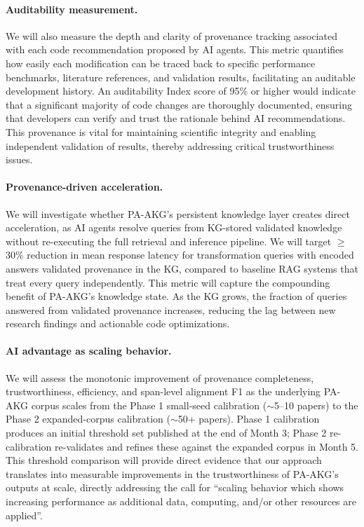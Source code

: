\paragraph{Auditability measurement.} We will also measure the depth and clarity of provenance tracking associated with each code recommendation proposed by AI agents. This metric quantifies how easily each modification can be traced back to specific performance benchmarks, literature references, and validation results, facilitating an auditable development history. An auditability Index score of 95\% or higher would indicate that a significant majority of code changes are thoroughly documented, ensuring that developers can verify and trust the rationale behind AI recommendations. This provenance is vital for maintaining scientific integrity and enabling independent validation of results, thereby addressing critical trustworthiness issues.

\paragraph{Provenance-driven acceleration.} We will investigate whether PA-AKG's persistent knowledge layer creates direct acceleration, as AI agents resolve queries from KG-stored validated knowledge without re-executing the full retrieval and inference pipeline. We will target $\geq$30\% reduction in mean response latency for transformation queries with encoded answers validated provenance in the KG, compared to baseline RAG systems that treat every query independently. This metric will capture the compounding benefit of PA-AKG's knowledge state. As the KG grows, the fraction of queries answered from validated provenance increases, reducing the lag between new research findings and actionable code optimizations.

\paragraph{AI advantage as scaling behavior.} We will assess the monotonic improvement of provenance completeness, trustworthiness, efficiency, and span-level alignment F1 as the underlying PA-AKG corpus scales from the Phase 1 small-seed calibration ($\sim$5--10 papers) to the Phase 2 expanded-corpus calibration ($\sim$50+ papers). Phase 1 calibration produces an initial threshold set published at the end of Month 3; Phase 2 re-calibration re-validates and refines these against the expanded corpus in Month 5. This threshold comparison will provide direct evidence that our approach translates into measurable improvements in the trustworthiness of PA-AKG's outputs at scale, directly addressing the call for ``scaling behavior which shows increasing performance as additional data, computing, and/or other resources are applied''.


